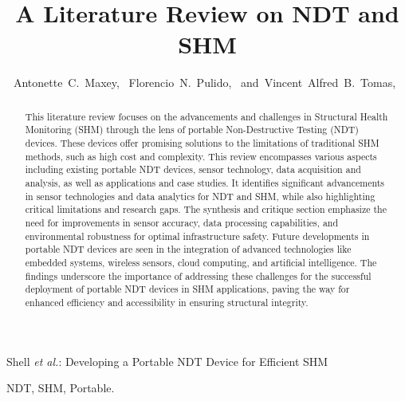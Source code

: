 \documentclass[journal, a4paper]{IEEEtran}
\begin{document}
\title{A Literature Review on NDT and SHM}


\author{Antonette~C.~Maxey,~
        Florencio~N.~Pulido,~
        and~Vincent~Alfred~B.~Tomas,~%
}



%
{Shell \MakeLowercase{\textit{et al.}}: Developing a Portable NDT Device for Efficient SHM}


\maketitle


\begin{abstract}
  This literature review focuses on the advancements and challenges in Structural Health Monitoring (SHM)
  through the lens of portable Non-Destructive Testing (NDT) devices.
  These devices offer promising solutions to the limitations of traditional SHM methods, such as high cost and complexity.
  This review encompasses various aspects including existing portable NDT devices, sensor technology,
  data acquisition and analysis, as well as applications and case studies. It identifies significant advancements
  in sensor technologies and data analytics for NDT and SHM, while also highlighting critical limitations and research gaps.
  The synthesis and critique section emphasize the need for improvements in sensor accuracy, data processing capabilities,
  and environmental robustness for optimal infrastructure safety. Future developments in portable NDT devices are seen
  in the integration of advanced technologies like embedded systems, wireless sensors, cloud computing, and artificial intelligence.
  The findings underscore the importance of addressing these challenges for the successful deployment of portable NDT
  devices in SHM applications, paving the way for enhanced efficiency and accessibility in ensuring structural integrity.
\end{abstract}


\begin{IEEEkeywords}
  NDT, SHM, Portable.
\end{IEEEkeywords}
\end{document}
